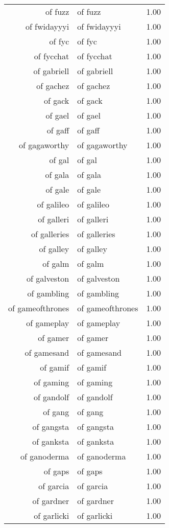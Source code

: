 \begin{table}[ht]
\begin{tabular}{rlr}
  of fuzz & of fuzz & 1.00 \\ 
  of fwidayyyi & of fwidayyyi & 1.00 \\ 
  of fyc & of fyc & 1.00 \\ 
  of fycchat & of fycchat & 1.00 \\ 
  of gabriell & of gabriell & 1.00 \\ 
  of gachez & of gachez & 1.00 \\ 
  of gack & of gack & 1.00 \\ 
  of gael & of gael & 1.00 \\ 
  of gaff & of gaff & 1.00 \\ 
  of gagaworthy & of gagaworthy & 1.00 \\ 
  of gal & of gal & 1.00 \\ 
  of gala & of gala & 1.00 \\ 
  of gale & of gale & 1.00 \\ 
  of galileo & of galileo & 1.00 \\ 
  of galleri & of galleri & 1.00 \\ 
  of galleries & of galleries & 1.00 \\ 
  of galley & of galley & 1.00 \\ 
  of galm & of galm & 1.00 \\ 
  of galveston & of galveston & 1.00 \\ 
  of gambling & of gambling & 1.00 \\ 
  of gameofthrones & of gameofthrones & 1.00 \\ 
  of gameplay & of gameplay & 1.00 \\ 
  of gamer & of gamer & 1.00 \\ 
  of gamesand & of gamesand & 1.00 \\ 
  of gamif & of gamif & 1.00 \\ 
  of gaming & of gaming & 1.00 \\ 
  of gandolf & of gandolf & 1.00 \\ 
  of gang & of gang & 1.00 \\ 
  of gangsta & of gangsta & 1.00 \\ 
  of ganksta & of ganksta & 1.00 \\ 
  of ganoderma & of ganoderma & 1.00 \\ 
  of gaps & of gaps & 1.00 \\ 
  of garcia & of garcia & 1.00 \\ 
  of gardner & of gardner & 1.00 \\ 
  of garlicki & of garlicki & 1.00 \\ 

\end{tabular}
\end{table}

